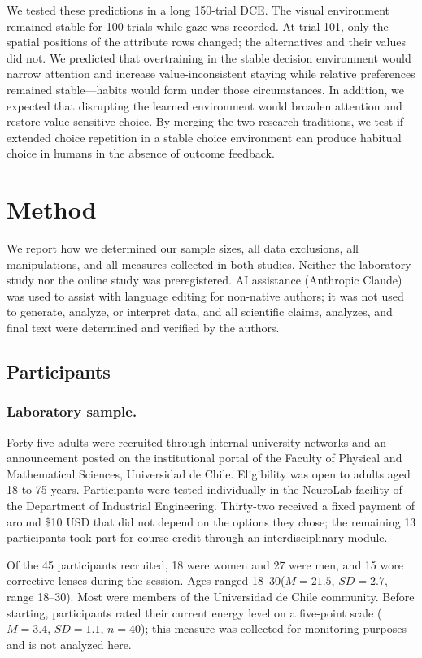 \documentclass[man,natbib,floatsintext]{apa7}
\begin{document}
We tested these predictions in a long 150-trial DCE. The visual environment remained stable for 100 trials while gaze was recorded. At trial 101, only the spatial positions of the attribute rows changed; the alternatives and their values did not. We predicted that overtraining in the stable decision environment would narrow attention and increase value-inconsistent staying while relative preferences remained stable---habits would form under those circumstances. In addition, we expected that disrupting the learned environment would broaden attention and restore value-sensitive choice. By merging the two research traditions, we test if extended choice repetition in a stable choice environment can produce habitual choice in humans in the absence of outcome feedback.

\section{Method}

We report how we determined our sample sizes, all data exclusions, all manipulations, and all measures collected in both studies. Neither the laboratory study nor the online study was preregistered. AI assistance (Anthropic Claude) was used to assist with language editing for non-native authors; it was not used to generate, analyze, or interpret data, and all scientific claims, analyzes, and final text were determined and verified by the authors.

\subsection{Participants}

\subsubsection{Laboratory sample.} Forty-five adults were recruited through internal university networks and an announcement posted on the institutional portal of the Faculty of Physical and Mathematical Sciences, Universidad de Chile. Eligibility was open to adults aged 18 to 75 years. Participants were tested individually in the NeuroLab facility of the Department of Industrial Engineering. Thirty-two received a fixed payment of around \$10 USD that did not depend on the options they chose; the remaining 13 participants took part for course credit through an interdisciplinary module.

Of the 45 participants recruited, 18 were women and 27 were men, and 15 wore corrective lenses during the session. Ages ranged 18--30($M = 21.5$, $SD = 2.7$, range 18--30). Most were members of the Universidad de Chile community. Before starting, participants rated their current energy level on a five-point scale ($M = 3.4$, $SD = 1.1$, $n = 40$); this measure was collected for monitoring purposes and is not analyzed here.
\end{document}
